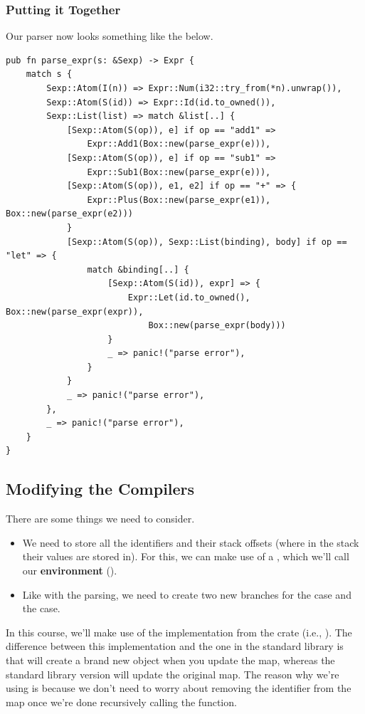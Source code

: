 \subsubsection{Putting it Together}
Our parser now looks something like the below.
\begin{verbatim}
pub fn parse_expr(s: &Sexp) -> Expr {
    match s {
        Sexp::Atom(I(n)) => Expr::Num(i32::try_from(*n).unwrap()),
        Sexp::Atom(S(id)) => Expr::Id(id.to_owned()),
        Sexp::List(list) => match &list[..] {
            [Sexp::Atom(S(op)), e] if op == "add1" => 
                Expr::Add1(Box::new(parse_expr(e))),
            [Sexp::Atom(S(op)), e] if op == "sub1" => 
                Expr::Sub1(Box::new(parse_expr(e))),
            [Sexp::Atom(S(op)), e1, e2] if op == "+" => {
                Expr::Plus(Box::new(parse_expr(e1)), Box::new(parse_expr(e2)))
            }
            [Sexp::Atom(S(op)), Sexp::List(binding), body] if op == "let" => {
                match &binding[..] {
                    [Sexp::Atom(S(id)), expr] => {
                        Expr::Let(id.to_owned(), Box::new(parse_expr(expr)), 
                            Box::new(parse_expr(body)))
                    }
                    _ => panic!("parse error"),
                }
            }
            _ => panic!("parse error"),
        },
        _ => panic!("parse error"),
    }
}\end{verbatim}

\subsection{Modifying the Compilers}
There are some things we need to consider. 
\begin{itemize}
    \item We need to store all the identifiers and their stack offsets (where in the stack their values are stored in). For this, we can make use of a , which we'll call our \textbf{environment} (). 
    \item Like with the parsing, we need to create two new branches for the  case and the  case.  
\end{itemize}
In this course, we'll make use of the  implementation from the  crate (i.e., ). The difference between this  implementation and the one in the standard library is that  will create a brand new  object when you update the map, whereas the standard library version will update the original map. The reason why we're using  is because we don't need to worry about removing the identifier from the map once we're done recursively calling the  function.

